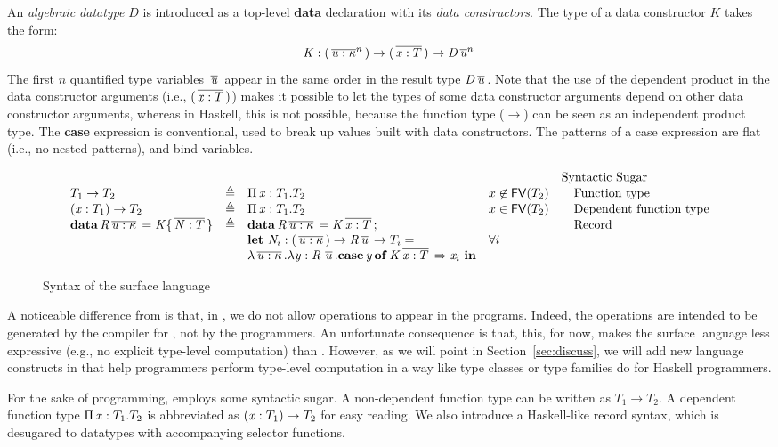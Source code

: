 An \emph{algebraic datatype} $D$ is introduced as a top-level
\textbf{data} declaration with its \emph{data constructors}. The type
of a data constructor $K$ takes the form:
\[
\mathit{K}  :  (  \,\overline{  \mathit{u}  :  \kappa  }^{n}\,  )  \rightarrow  (  \,\overline{  \mathit{x}  :  T  }\,  )  \rightarrow  \mathit{D}    \,\overline{  \mathit{u}  }^{n}\,
\]
The first $n$ quantified type variables $\,\overline{  \mathit{u}  }\,$ appear in the same
order in the result type $\mathit{D}    \,\overline{  \mathit{u}  }\,$.  Note that the use of the
dependent product in the data constructor arguments (i.e.,
$(  \,\overline{  \mathit{x}  :  T  }\,  )$) makes it possible to let the types of some data
constructor arguments depend on other data constructor arguments,
whereas in Haskell, this is not possible, because the function type
($\rightarrow$) can be seen as an independent product type. The
\textbf{case} expression is conventional, used to break up values
built with data constructors.  The patterns of a case expression are
flat (i.e., no nested patterns), and bind variables.

\begin{figure*}
\centering
\gram{\ottpgm\ottinterrule
\ottdecl\ottinterrule
\ottu\ottinterrule
\ottp\ottinterrule
\ottE\ottinterrule
\ottGs}
\[\begin{array}{lllll} &&&& \text{Syntactic Sugar} \\ T_{{\mathrm{1}}} \rightarrow T_{{\mathrm{2}}} & \triangleq & \Pi \, \mathit{x} : T_{{\mathrm{1}}} . T_{{\mathrm{2}}} & x \not \in \mathsf{FV}(T_{{\mathrm{2}}}) & \quad\text{Function type} \\ ( \mathit{x} : T_{{\mathrm{1}}} ) \rightarrow T_{{\mathrm{2}}} & \triangleq & \Pi \, \mathit{x} : T_{{\mathrm{1}}} . T_{{\mathrm{2}}} & x \in \mathsf{FV}(T_{{\mathrm{2}}}) & \quad\text{Dependent function type} \\ \mathbf{data} \, \mathit{R} \,\overline{ \mathit{u} : \kappa }\, = \mathit{K} \{ \,\overline{ \mathit{N} : T }\, \} & \triangleq & \mathbf{data} \, \mathit{R} \,\overline{ \mathit{u} : \kappa }\, = \mathit{K} \,\overline{ \mathit{x} : T }\,; && \quad\text{Record} \\ && \mathbf{let} ~\mathit{N}_i : ( \,\overline{ \mathit{u} : \kappa }\, ) \rightarrow \mathit{R} \,\overline{ \mathit{u} }\, \rightarrow T_i = & \forall i & \\ && \lambda \,\overline{ \mathit{u} : \kappa }\, . \lambda \mathit{y} : \mathit{R} \, \,\overline{ \mathit{u} }\, . \mathbf{case} \, \mathit{y} \, \mathbf{of} \, \mathit{K} \,\overline{ \mathit{x} : T }\, \Rightarrow \mathit{x}_i~ \mathbf{in} && \\ \end{array}\] %
\caption{Syntax of the surface language}
\label{fig:surface:syntax}
\end{figure*}

A noticeable difference from \name is that, in \sufcc, we do not allow
\cast operations to appear in the programs. Indeed, the \cast
operations are intended to be generated by the compiler for \name, not
by the programmers. An unfortunate consequence is that, this, for now,
makes the surface language less expressive (e.g., no explicit
type-level computation) than \name. However, as we will point in
Section~\ref{sec:discuss}, we will add new language constructs in
\sufcc that help programmers perform type-level computation in a way
like type classes or type families do for Haskell programmers.

For the sake of programming, \sufcc employs some syntactic sugar. A
non-dependent function type can be written as $T_{{\mathrm{1}}}  \rightarrow  T_{{\mathrm{2}}}$. A
dependent function type $\Pi \, \mathit{x}  :  T_{{\mathrm{1}}}  .  T_{{\mathrm{2}}}$ is abbreviated as
$(  \mathit{x}  :  T_{{\mathrm{1}}}  )  \rightarrow  T_{{\mathrm{2}}}$ for easy reading. We also introduce a
Haskell-like record syntax, which is desugared to datatypes with
accompanying selector functions.


